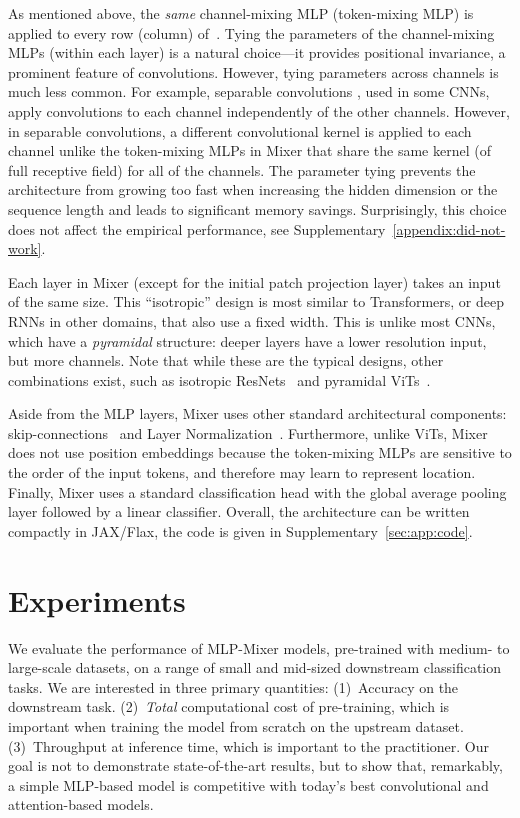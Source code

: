 \documentclass{article}
\newcommand{\fullname}{MLP-Mixer}
\newcommand{\name}{Mixer}
\begin{document}
As mentioned above, the \emph{same} channel-mixing MLP (token-mixing MLP) is applied to every row (column) of~.
Tying the parameters of the channel-mixing MLPs (within each layer) is a natural choice---it provides positional invariance, a prominent feature of convolutions.
However, tying  parameters across channels is much less common.
For example, separable convolutions \cite{chollet2017xception,Sifre2014phd}, used in some CNNs, apply convolutions to each channel independently of the other channels.
However, in separable convolutions, a different convolutional
kernel is applied to each channel unlike the token-mixing MLPs in \name{} that share the same kernel (of full receptive field) for all of the channels.
The parameter tying prevents the architecture from growing too fast when increasing the hidden dimension  or the sequence length  and leads to significant memory savings.
Surprisingly, this choice does not affect the empirical performance, see Supplementary~\ref{appendix:did-not-work}.

Each layer in \name{} (except for the initial patch projection layer) takes an input of the same size.
This ``isotropic'' design is most similar to Transformers, or deep RNNs in other domains, that also use a fixed width.
This is unlike most CNNs, which have a \emph{pyramidal} structure: deeper layers have a lower resolution input, but more channels.
Note that while these are the typical designs, other combinations exist, such as isotropic ResNets~\citep{Sandler2019} and pyramidal ViTs~\citep{wang2021pyramid}.

Aside from the MLP layers, \name{} uses other standard architectural components: skip-con\-nec\-tions~\cite{he2016deep} and Layer Normalization~\cite{ba2016layer}.
Furthermore, unlike ViTs, \name{} does not use position embeddings because the token-mixing MLPs are sensitive to the order of the input tokens, and therefore may learn to represent location.
Finally, \name{} uses a standard classification head with the global average pooling layer followed by a linear classifier. 
Overall, the architecture can be written compactly in JAX/Flax, the code is given in Supplementary~\ref{sec:app:code}.


\section{Experiments}
We evaluate the performance of \fullname{} models, pre-trained with medium- to large-scale datasets,
on a range of small and mid-sized downstream classification tasks.
We are interested in three primary quantities:
(1)~Accuracy on the downstream task.
(2)~\emph{Total} computational cost of pre-training, which is important when training the model from scratch on the upstream dataset.
(3)~Throughput at inference time, which is important to the practitioner.
Our goal is not to demonstrate state-of-the-art results, but to show that, remarkably, a simple MLP-based model is competitive with today's best convolutional and attention-based models.
\end{document}
